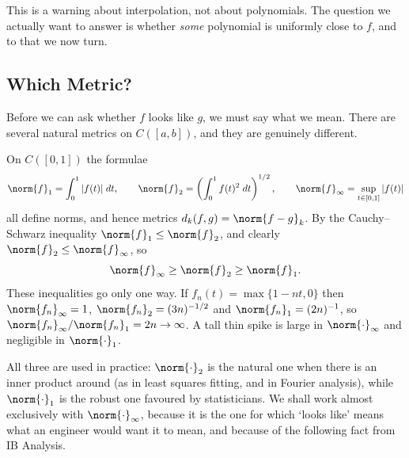 \documentclass[a4paper]{scrartcl}
\begin{document}
\begin{center}
\end{center}

This is a warning about interpolation, not about polynomials. The question we actually want to answer is whether \emph{some} polynomial is uniformly close to $f$, and to that we now turn.

\subsection{Which Metric?}

Before we can ask whether $f$ looks like $g$, we must say what we mean. There are several natural metrics on $C([a,b])$, and they are genuinely different.

\begin{example}
	On $C([0,1])$ the formulae
	$$\norm{f}_1 = \int_0^1|f(t)|\dd t, \qquad \norm{f}_2 = \left(\int_0^1 f(t)^2\dd t\right)^{1/2}, \qquad \norm{f}_\infty = \sup_{t\in[0,1]}|f(t)|$$
	all define norms, and hence metrics $d_k(f,g) = \norm{f-g}_k$. By the Cauchy--Schwarz inequality $\norm{f}_1 \leq \norm{f}_2$, and clearly $\norm{f}_2\leq\norm{f}_\infty$, so
	$$\norm{f}_\infty \geq \norm{f}_2\geq \norm{f}_1.$$
	These inequalities go only one way. If $f_n(t) = \max\{1-nt,0\}$ then $\norm{f_n}_\infty = 1$, $\norm{f_n}_2 = (3n)^{-1/2}$ and $\norm{f_n}_1 = (2n)^{-1}$, so $\norm{f_n}_\infty/\norm{f_n}_1 = 2n \to \infty$. A tall thin spike is large in $\norm{\cdot}_\infty$ and negligible in $\norm{\cdot}_1$.
\end{example}

All three are used in practice: $\norm{\cdot}_2$ is the natural one when there is an inner product around (as in least squares fitting, and in Fourier analysis), while $\norm{\cdot}_1$ is the robust one favoured by statisticians. We shall work almost exclusively with $\norm{\cdot}_\infty$, because it is the one for which `looks like' means what an engineer would want it to mean, and because of the following fact from IB Analysis.
\end{document}
